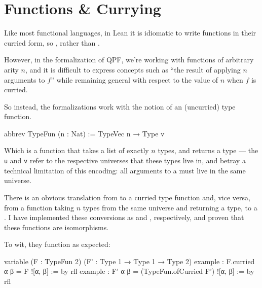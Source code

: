 \documentclass[titlepage]{report}
\begin{document}
\section{Functions \& Currying}
Like most functional languages, in Lean it is idiomatic to write functions in their curried form, 
so , rather than .

However, in the formalization of QPF, we're working with functions of arbitrary arity $n$, and it 
is difficult to express concepts such as ``the result of applying $n$ arguments to $f$'' while remaining
general with respect to the value of $n$ when $f$ is curried.

So instead, the formalizations work with the notion of an (uncurried) type function.

\begin{leancode}
    abbrev TypeFun (n : Nat)
      := TypeVec n → Type v
\end{leancode}

Which is a function that takes a list of exactly $n$ types, and returns a type --- the \texttt{u} and
\texttt{v} refer to the respective universes that these types live in, and betray a technical limitation
of this encoding: all arguments to a  must live in the same universe.

There is an obvious translation from  to a curried type function and, vice versa, from
a function taking $n$ types from the same universe and returning a type, to a .
I have implemented these conversions as  and , respectively,
and proven that these functions are isomorphisms. 

To wit, they function as expected:
\begin{leancode}
    variable (F : TypeFun 2) (F' : Type 1 → Type 1 → Type 2)
    example : F.curried α β = F ![α, β]                 := by rfl
    example : F' α β = (TypeFun.ofCurried F') ![α, β]   := by rfl
\end{leancode}
\end{document}
